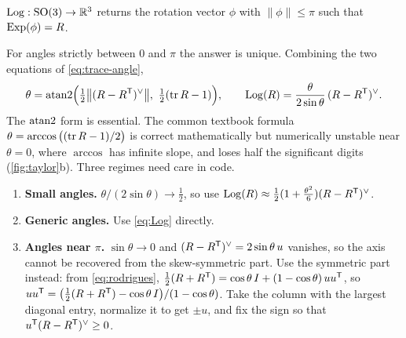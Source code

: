 \begin{definition}
$\operatorname{Log}: \mathrm{SO}(3) \to \mathbb{R}^3$ returns the rotation vector $\phi$ with $\|\phi\| \le \pi$ such that
$\operatorname{Exp}(\phi) = R$.
\end{definition}

For angles strictly between $0$ and $\pi$ the answer is unique. Combining the two equations of
\eqref{eq:trace-angle},
\begin{equation}
  \theta = \operatorname{atan2}\!\Big( \tfrac12\big\|(R - R^{\mathsf{T}})^{\vee}\big\|,\ \tfrac12(\operatorname{tr} R - 1) \Big), \qquad
  \operatorname{Log}(R) = \frac{\theta}{2\sin\theta}\,(R - R^{\mathsf{T}})^{\vee} .
  \label{eq:Log}
\end{equation}
The $\operatorname{atan2}$ form is essential. The common textbook formula $\theta = \arccos\big((\operatorname{tr} R - 1)/2\big)$ is
correct mathematically but numerically unstable near $\theta = 0$, where $\arccos$ has infinite slope,
and loses half the significant digits (\cref{fig:taylor}b). Three regimes need care in code.

\begin{enumerate}
  \item \textbf{Small angles.} $\theta/(2\sin\theta) \to \tfrac12$, so use
        $\operatorname{Log}(R) \approx \tfrac12(1 + \tfrac{\theta^2}{6})(R - R^{\mathsf{T}})^{\vee}$.
  \item \textbf{Generic angles.} Use \eqref{eq:Log} directly.
  \item \textbf{Angles near $\pi$.} $\sin\theta \to 0$ and $(R - R^{\mathsf{T}})^{\vee} = 2\sin\theta\,u$ vanishes, so
        the axis cannot be recovered from the skew-symmetric part. Use the symmetric part instead: from
        \eqref{eq:rodrigues}, $\tfrac12(R + R^{\mathsf{T}}) = \cos\theta\,I + (1-\cos\theta)\,uu^{\mathsf{T}}$, so
        $uu^{\mathsf{T}} = \big(\tfrac12(R + R^{\mathsf{T}}) - \cos\theta\, I\big)/(1 - \cos\theta)$. Take the column with the largest
        diagonal entry, normalize it to get $\pm u$, and fix the sign so that $u^{\mathsf{T}}(R - R^{\mathsf{T}})^{\vee} \ge 0$.
\end{enumerate}


